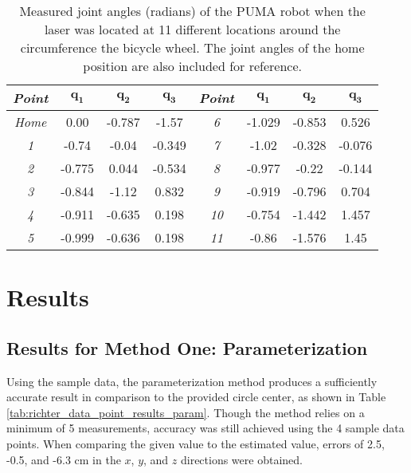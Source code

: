\documentclass[12pt]{article}
\begin{document}
\begin{table}[ht!]
\begin{center}
\begin{tabular}{|c|c|c|c|c|c|c|c|}
\hline
\textit{\textbf{Point}} & $\mathbf{q_1}$ & $\mathbf{q_2}$ & $\mathbf{q_3}$ & \textit{\textbf{Point}} & $\mathbf{q_1}$ & $\mathbf{q_2}$ & $\mathbf{q_3}$ \\ \hline
\textit{Home}              & 0.00       & -0.787       & -1.57      & \textit{6}              & -1.029      & -0.853      & 0.526       \\ \hline
\textit{1}              & -0.74      & -0.04       & -0.349      & \textit{7}              & -1.02       & -0.328      & -0.076      \\ \hline
\textit{2}              & -0.775      & 0.044       & -0.534       & \textit{8}              & -0.977      & -0.22       & -0.144      \\ \hline
\textit{3}              & -0.844      & -1.12       & 0.832       & \textit{9}              & -0.919      & -0.796      & 0.704       \\ \hline
\textit{4}              & -0.911      & -0.635      & 0.198       & \textit{10}             & -0.754      & -1.442      & 1.457       \\ \hline
\textit{5}              & -0.999      & -0.636      & 0.198            & \textit{11}             & -0.86       & -1.576      & 1.45        \\ \hline
\end{tabular}
\caption{Measured joint angles (radians) of the PUMA robot when the laser was located at 11 different locations around the circumference the bicycle wheel. The joint angles of the home position are also included for reference.}
\label{tab:exp_points}
\end{center}
\end{table}

\section{Results}


\subsection{Results for Method One: Parameterization}
Using the sample data, the parameterization method produces a sufficiently accurate result in comparison to the provided circle center, as shown in Table \ref{tab:richter_data_point_results_param}. Though the method relies on a minimum of 5 measurements, accuracy was still achieved using the 4 sample data points. 
When comparing the given value to the estimated value, errors of 2.5, -0.5, and -6.3 cm in the $x$,  $y$, and $z$ directions were obtained.
\end{document}
